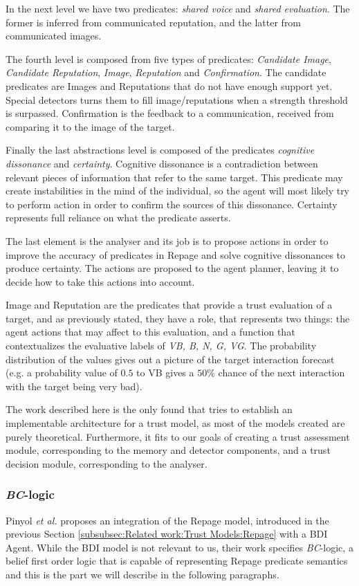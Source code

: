 In the next level we have two predicates: \textit{shared voice} and \textit{shared evaluation}. The former is inferred from communicated reputation, and the latter from communicated images. 

The fourth level is composed from five types of predicates: \textit{Candidate Image}, \textit{Candidate Reputation}, \textit{Image}, \textit{Reputation} and \textit{Confirmation}. The candidate predicates are Images and Reputations that do not have enough support yet. Special detectors turns them to fill image/reputations when a strength threshold is surpassed. Confirmation is the feedback to a communication, received from comparing it to the image of the target. 

Finally the last abstractions level is composed of the predicates \textit{cognitive dissonance} and \textit{certainty}. Cognitive dissonance is a contradiction between relevant pieces of information that refer to the same target. This predicate may create instabilities in the mind of the individual, so the agent will most likely try to perform action in order to confirm the sources of this dissonance. Certainty represents full reliance on what the predicate asserts.

The last element is the analyser and its job is to propose actions in order to improve the accuracy of predicates in Repage and solve cognitive dissonances to produce certainty. The actions are proposed to the agent planner, leaving it to decide how to take this actions into account.

Image and Reputation are the predicates that provide a trust evaluation of a target, and as previously stated, they have a role, that represents two things: the agent actions that may affect to this evaluation, and a function that contextualizes the evaluative labels of \textit{VB, B, N, G, VG}. The probability distribution of the values gives out a picture of the target interaction forecast (e.g. a probability value of $0.5$ to VB gives a $50\%$ chance of the next interaction with the target being very bad).

The work described here is the only found that tries to establish an implementable architecture for a trust model, as most of the models created are purely theoretical. Furthermore, it fits to our goals of creating a trust assessment module, corresponding to the memory and detector components, and a trust decision module, corresponding to the analyser.


\subsubsection{\textit{BC}-logic}
\label{subsubsec:Related work:Trust Models:BDI + Repage}
Pinyol \textit{et al.} \cite{Pinyol2009} proposes an integration of the Repage model, introduced in the previous Section \ref{subsubsec:Related work:Trust Models:Repage} with a BDI Agent\cite{Rao1995}. While the BDI model is not relevant to us, their work specifies \textit{BC}-logic, a belief first order logic that is capable of representing Repage predicate semantics and this is the part we will describe in the following paragraphs.

